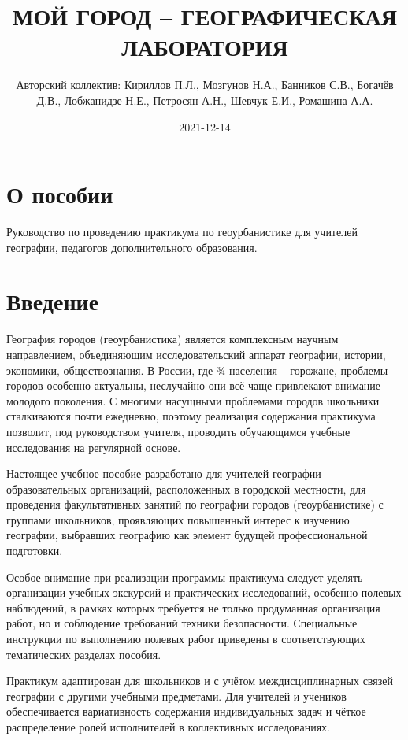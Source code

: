 \documentclass[
  11pt,
  russian,
]{book}
\title{МОЙ ГОРОД -- ГЕОГРАФИЧЕСКАЯ ЛАБОРАТОРИЯ}
\author{Авторский коллектив: Кириллов П.Л., Мозгунов Н.А., Банников
С.В., Богачёв Д.В., Лобжанидзе Н.Е., Петросян А.Н., Шевчук Е.И.,
Ромашина А.А.}
\date{2021-12-14}
\begin{document}
\frontmatter
\maketitle

\mainmatter
\hypertarget{ux43e-ux43fux43eux441ux43eux431ux438ux438}{%
\chapter*{О пособии}\label{ux43e-ux43fux43eux441ux43eux431ux438ux438}}

Руководство по проведению практикума по геоурбанистике для учителей
географии, педагогов дополнительного образования.

\hypertarget{ux432ux432ux435ux434ux435ux43dux438ux435}{%
\chapter*{Введение}\label{ux432ux432ux435ux434ux435ux43dux438ux435}}

География городов (геоурбанистика) является комплексным научным
направлением, объединяющим исследовательский аппарат географии, истории,
экономики, обществознания. В России, где ¾ населения -- горожане,
проблемы городов особенно актуальны, неслучайно они всё чаще привлекают
внимание молодого поколения. С многими насущными проблемами городов
школьники сталкиваются почти ежедневно, поэтому реализация содержания
практикума позволит, под руководством учителя, проводить обучающимся
учебные исследования на регулярной основе.

Настоящее учебное пособие разработано для учителей географии
образовательных организаций, расположенных в городской местности, для
проведения факультативных занятий по географии городов (геоурбанистике)
с группами школьников, проявляющих повышенный интерес к изучению
географии, выбравших географию как элемент будущей профессиональной
подготовки.

Особое внимание при реализации программы практикума следует уделять
организации учебных экскурсий и практических исследований, особенно
полевых наблюдений, в рамках которых требуется не только продуманная
организация работ, но и соблюдение требований техники безопасности.
Специальные инструкции по выполнению полевых работ приведены в
соответствующих тематических разделах пособия.

Практикум адаптирован для школьников и с учётом междисциплинарных связей
географии с другими учебными предметами. Для учителей и учеников
обеспечивается вариативность содержания индивидуальных задач и чёткое
распределение ролей исполнителей в коллективных исследованиях.
\end{document}
